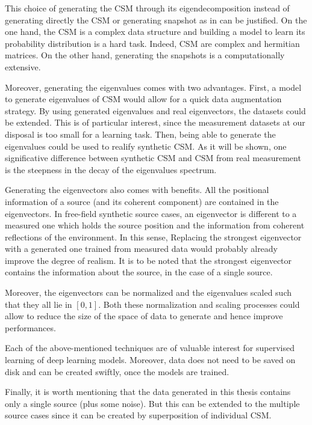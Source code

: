 \documentclass[11pt,a4paper,twoside]{report}
\begin{document}
This choice of generating the CSM through its eigendecomposition instead of generating directly the CSM or generating snapshot as in \cite{gerstoft2020parametric} can be justified. On the one hand, the CSM is a complex data structure and building a model to learn its probability distribution is a hard task. Indeed, CSM are complex and hermitian matrices. On the other hand, generating the snapshots is a computationally extensive.

Moreover, generating the eigenvalues comes with two advantages. First, a model to generate eigenvalues of CSM would allow for a quick data augmentation strategy. By using generated eigenvalues and real eigenvectors, the datasets could be extended. This is of particular interest, since the measurement datasets at our disposal is too small for a learning task. Then, being able to generate the eigenvalues could be used to realify synthetic CSM. As it will be shown, one significative difference between synthetic CSM and CSM from real measurement is the steepness in the decay of the eigenvalues spectrum.

Generating the eigenvectors also comes with benefits. All the positional information of a source (and its coherent component) are contained in the eigenvectors. In free-field synthetic source cases, an eigenvector is different to a measured one which holds the source position and the information from coherent reflections of the environment. In this sense, Replacing the strongest eigenvector with a generated one trained from measured data would probably already improve the degree of realism. It is to be noted that the strongest eigenvector contains the information about the source, in the case of a single source.

Moreover, the eigenvectors can be normalized and the eigenvalues scaled such that they all lie in $[0,1]$. Both these normalization and scaling processes could allow to reduce the size of the space of data to generate and hence improve performances.

Each of the above-mentioned techniques are of valuable interest for supervised learning of deep learning models. Moreover, data does not need to be saved on disk and can be created swiftly, once the models are trained. 

Finally, it is worth mentioning that the data generated in this thesis contains only a single source (plus some noise). But this can be extended to  the multiple source cases since it can be created by superposition of individual CSM.
\end{document}
